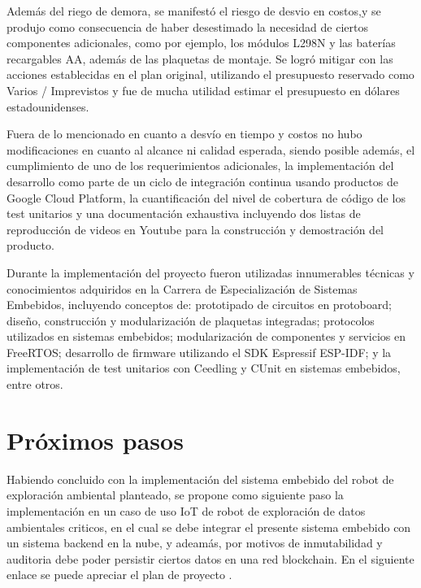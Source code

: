 Además del riego de demora, se manifestó el riesgo de desvio en costos,y se produjo como consecuencia de haber desestimado la necesidad de ciertos componentes adicionales, como por ejemplo, los módulos L298N y las baterías recargables AA, además de las plaquetas de montaje. Se logró mitigar con las acciones establecidas en el plan original, utilizando el presupuesto reservado como Varios / Imprevistos y fue de mucha utilidad estimar el presupuesto en dólares estadounidenses.


Fuera de lo mencionado en cuanto a desvío en tiempo y costos no hubo modificaciones en cuanto al alcance ni calidad esperada, siendo posible además, el cumplimiento de uno de los requerimientos adicionales, la implementación del desarrollo como parte de un ciclo de integración continua usando productos de Google Cloud Platform, la cuantificación del nivel de cobertura de código de los test unitarios y una documentación exhaustiva incluyendo dos listas de reproducción de videos en Youtube para la construcción y demostración del producto.


Durante la implementación del proyecto fueron utilizadas innumerables técnicas y conocimientos adquiridos en la Carrera de Especialización de Sistemas Embebidos, incluyendo conceptos de: prototipado de circuitos en protoboard; diseño, construcción y modularización de plaquetas integradas; protocolos utilizados en sistemas embebidos; modularización de componentes y servicios en FreeRTOS; desarrollo de firmware utilizando el SDK Espressif ESP-IDF; y la implementación de test unitarios con Ceedling y CUnit en sistemas embebidos, entre otros.





\section{Próximos pasos}

Habiendo concluido con la implementación del sistema embebido del robot de exploración ambiental planteado, se propone como siguiente paso la implementación en un caso de uso IoT de robot de exploración de datos ambientales criticos, en el cual se debe integrar el presente sistema embebido con un sistema backend en la nube, y adeamás, por motivos de inmutabilidad y auditoria debe poder persistir ciertos datos en una red blockchain. En el siguiente enlace se puede apreciar el plan de proyecto \cite{Robot_CEIOT_Planificacion_doc}.
